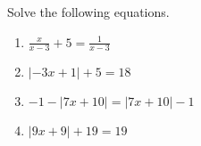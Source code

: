 \documentclass{article}
\begin{document}
\HomeworkTitle[class={College Algebra}, number={1}, name={Linear Equations}]

Solve the following equations.

\begin{enumerate}
\item $\displaystyle\frac{x}{x - 3} + 5 = \displaystyle\frac{1}{x - 3}$ \vspace{5cm}

\item $|-3x + 1| + 5 = 18$ \vspace{5cm}

\item $-1 - |7x + 10| = |7x + 10| - 1$ \vspace{5cm}

\item $|9x + 9| + 19 = 19$
\end{enumerate}
\end{document}
